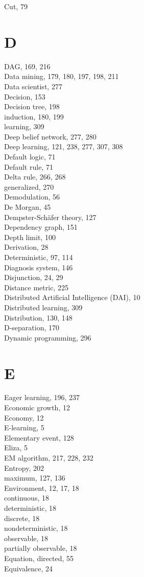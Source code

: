 \documentclass[10pt]{book}
\begin{document}
Cut, 79

\section*{D}
DAG, 169, 216\\
Data mining, 179, 180, 197, 198, 211\\
Data scientist, 277\\
Decision, 153\\
Decision tree, 198\\
induction, 180, 199\\
learning, 309\\
Deep belief network, 277, 280\\
Deep learning, 121, 238, 277, 307, 308\\
Default logic, 71\\
Default rule, 71\\
Delta rule, 266, 268\\
generalized, 270\\
Demodulation, 56\\
De Morgan, 45\\
Dempster-Schäfer theory, 127\\
Dependency graph, 151\\
Depth limit, 100\\
Derivation, 28\\
Deterministic, 97, 114\\
Diagnosis system, 146\\
Disjunction, 24, 29\\
Distance metric, 225\\
Distributed Artificial Intelligence (DAI), 10\\
Distributed learning, 309\\
Distribution, 130, 148\\
D-separation, 170\\
Dynamic programming, 296

\section*{E}
Eager learning, 196, 237\\
Economic growth, 12\\
Economy, 12\\
E-learning, 5\\
Elementary event, 128\\
Eliza, 5\\
EM algorithm, 217, 228, 232\\
Entropy, 202\\
maximum, 127, 136\\
Environment, 12, 17, 18\\
continuous, 18\\
deterministic, 18\\
discrete, 18\\
nondeterministic, 18\\
observable, 18\\
partially observable, 18\\
Equation, directed, 55\\
Equivalence, 24
\end{document}
